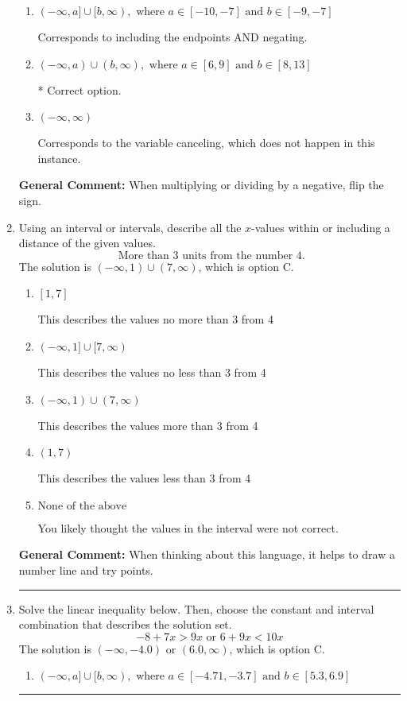 \documentclass{extbook}[14pt]
\newcommand{\litem}[1]{\item #1

\rule{\textwidth}{0.4pt}}
\begin{document}
\begin{enumerate}
{\begin{enumerate}[label=\Alph*.]
Corresponds to inverting the inequality and negating the solution.
\item \( (-\infty, a] \cup [b, \infty), \text{ where } a \in [-10, -7] \text{ and } b \in [-9, -7] \)

Corresponds to including the endpoints AND negating.
\item \( (-\infty, a) \cup (b, \infty), \text{ where } a \in [6, 9] \text{ and } b \in [8, 13] \)

 * Correct option.
\item \( (-\infty, \infty) \)

Corresponds to the variable canceling, which does not happen in this instance.
\end{enumerate}

\textbf{General Comment:} When multiplying or dividing by a negative, flip the sign.
}
\litem{
Using an interval or intervals, describe all the $x$-values within or including a distance of the given values.
\[ \text{ More than } 3 \text{ units from the number } 4. \]
The solution is \( (-\infty, 1) \cup (7, \infty) \), which is option C.\begin{enumerate}[label=\Alph*.]
\item \( [1, 7] \)

This describes the values no more than 3 from 4
\item \( (-\infty, 1] \cup [7, \infty) \)

This describes the values no less than 3 from 4
\item \( (-\infty, 1) \cup (7, \infty) \)

This describes the values more than 3 from 4
\item \( (1, 7) \)

This describes the values less than 3 from 4
\item \( \text{None of the above} \)

You likely thought the values in the interval were not correct.
\end{enumerate}

\textbf{General Comment:} When thinking about this language, it helps to draw a number line and try points.
}
\litem{
Solve the linear inequality below. Then, choose the constant and interval combination that describes the solution set.
\[ -8 + 7 x > 9 x \text{ or } 6 + 9 x < 10 x \]
The solution is \( (-\infty, -4.0) \text{ or } (6.0, \infty) \), which is option C.\begin{enumerate}[label=\Alph*.]
\item \( (-\infty, a] \cup [b, \infty), \text{ where } a \in [-4.71, -3.7] \text{ and } b \in [5.3, 6.9] \)


\end{enumerate}}
\end{enumerate}
\end{document}
